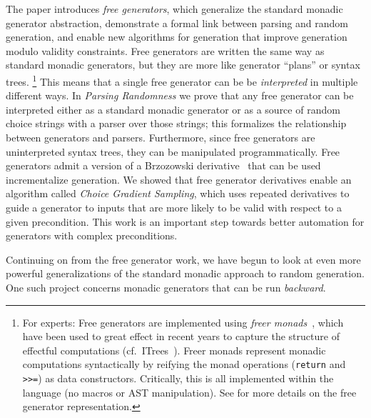 The paper introduces {\em free generators}, which generalize the standard
monadic generator abstraction, demonstrate a formal link between parsing and
random generation, and enable new algorithms for generation that improve
generation modulo validity constraints. Free generators are written the same
way as standard monadic generators, but they are more like generator ``plans''
or syntax trees.%
\footnote{For experts: Free generators are implemented using {\em freer
monads}~\cite{kiselyov2015freer}, which have been used to great effect in recent
years to capture the structure of effectful computations
(cf.~ITrees~\cite{old:xia2019interaction}). Freer monads represent
monadic computations syntactically by reifying the monad operations
(\lstinline{return} and \lstinline{>>=}) as data constructors. Critically, this
is all implemented within the language (no macros or AST
manipulation). See \cite{goldstein2022parsing} for more details on the
free generator representation.}
This means that a single free generator can be be {\em interpreted} in multiple
different ways. In {\em Parsing Randomness} we prove that any free generator can
be interpreted either as a standard monadic generator or as a source of
random choice strings with a parser over those strings; this formalizes the
relationship between generators and parsers. Furthermore, since free generators
are uninterpreted syntax trees, they can be manipulated programmatically. Free
generators admit a version of a Brzozowski
derivative~\cite{brzozowski1964derivatives} that can be used incrementalize
generation. We showed that free generator derivatives enable an algorithm called
{\em Choice Gradient Sampling}, which uses repeated derivatives to guide a
generator to inputs that are more likely to be valid with respect to a given
precondition. This work is an important step towards better automation for
generators with complex preconditions.

Continuing on from the free generator work, we have begun to look at even more
powerful generalizations of the standard monadic approach to random generation.
One such project concerns monadic generators that can be run {\em backward}.

